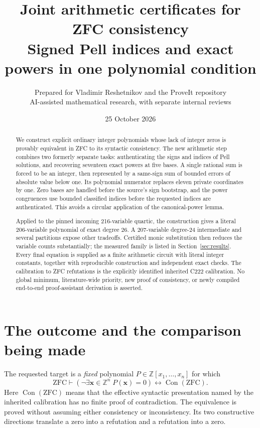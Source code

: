 \documentclass[11pt]{article}
\title{\textbf{Joint arithmetic certificates for ZFC consistency}\\[6pt]
\large Signed Pell indices and exact powers in one polynomial condition}
\author{Prepared for Vladimir Reshetnikov and the ProveIt repository\\
\small AI-assisted mathematical research, with separate internal reviews}
\date{25 October 2026}
\theoremstyle{definition}\newtheorem{definition}[theorem]{Definition}
\newcommand{\Z}{\mathbb Z}\newcommand{\N}{\mathbb N}
\newcommand{\Con}{\operatorname{Con}}\newcommand{\sgn}{\operatorname{sgn}}
\begin{document}
\maketitle
\begin{abstract}
We construct explicit ordinary integer polynomials whose lack of integer zeros
is provably equivalent in ZFC to its syntactic consistency. The new arithmetic
step combines two formerly separate tasks: authenticating the signs and indices
of Pell solutions, and recovering seventeen exact powers at five bases. A
single rational sum is forced to be an integer, then represented by a same-sign
sum of bounded errors of absolute value below one. Its polynomial numerator
replaces eleven private coordinates by one. Zero bases are handled before the
source's sign bootstrap, and the power congruences use bounded classified
indices before the requested indices are authenticated. This avoids a circular
application of the canonical-power lemma.

Applied to the pinned incoming 216-variable quartic, the construction gives a
literal 206-variable polynomial of exact degree 26. A 207-variable degree-24
intermediate and several partitions expose other tradeoffs. Certified monic
substitution then reduces the variable counts substantially; the measured
family is listed in Section~\ref{sec:results}. Every final equation is supplied
as a finite arithmetic circuit with literal integer constants, together with
reproducible construction and independent exact checks. The calibration to
ZFC refutations is the explicitly identified inherited C222 calibration.
No global minimum, literature-wide priority, new proof of consistency, or
newly compiled end-to-end proof-assistant derivation is asserted.
\end{abstract}
\tableofcontents

\section{The outcome and the comparison being made}
\label{sec:scope}

The requested target is a \emph{fixed} polynomial $P\in\Z[x_1,\ldots,x_n]$
for which
\begin{equation}\label{eq:target}
\mathrm{ZFC}\vdash
 \left(\neg\exists\boldsymbol{x}\in\Z^n\;P(\boldsymbol{x})=0\right)
 \longleftrightarrow\Con(\mathrm{ZFC}).
\end{equation}
Here $\Con(\mathrm{ZFC})$ means that the effective syntactic presentation
named by the inherited calibration has no finite proof of contradiction.
The equivalence is proved without assuming either consistency or
inconsistency. Its two constructive directions translate a zero into a
refutation and a refutation into a zero.
\end{document}
